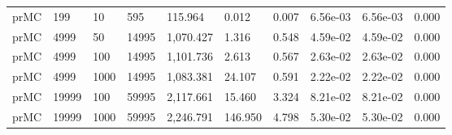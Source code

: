 \begin{tabular}{llllllllll}
prMC &    199 &         10 &         595 &   115.964 &                        0.012 &          0.007 &         6.56e-03 &        6.56e-03 &        0.000 \\
prMC &   4999 &         50 &       14995 & 1,070.427 &                        1.316 &          0.548 &         4.59e-02 &        4.59e-02 &        0.000 \\
prMC &   4999 &        100 &       14995 & 1,101.736 &                        2.613 &          0.567 &         2.63e-02 &        2.63e-02 &        0.000 \\
prMC &   4999 &       1000 &       14995 & 1,083.381 &                       24.107 &          0.591 &         2.22e-02 &        2.22e-02 &        0.000 \\
prMC &  19999 &        100 &       59995 & 2,117.661 &                       15.460 &          3.324 &         8.21e-02 &        8.21e-02 &        0.000 \\
prMC &  19999 &       1000 &       59995 & 2,246.791 &                      146.950 &          4.798 &         5.30e-02 &        5.30e-02 &        0.000 \\
\bottomrule
\end{tabular}
